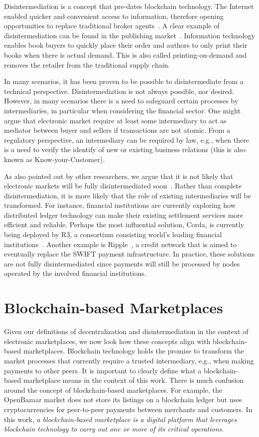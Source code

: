 Disintermediation is a concept that pre-dates blockchain technology.
The Internet enabled quicker and convenient access to information, therefore opening opportunities to replace traditional broker agents~\cite{wigand2020whatever}.
A clear example of disintermediation can be found in the publishing market~\cite{giaglis1999disintermediation}.
Information technology enables book buyers to quickly place their order and authors to only print their books when there is actual demand.
This is also called printing-on-demand and removes the retailer from the traditional supply chain.

In many scenarios, it has been proven to be possible to disintermediate from a technical perspective.
Disintermediation is not always possible, nor desired.
However, in many scenarios there is a need to safeguard certain processes by intermediaries, in particular when considering the financial sector.
One might argue that electronic market require at least some intermediary to act as mediator between buyer and sellers if transactions are not atomic.
From a regulatory perspective, an intermediary can be required by law, e.g., when there is a need to verify the identify of new or existing business relations (this is also known as Know-your-Customer).

As also pointed out by other researchers, we argue that it is not likely that electronic markets will be fully disintermediated soon~\cite{zamani2018little}.
Rather than complete disintermediation, it is more likely that the role of existing intermediaries will be transformed.
For instance, financial institutions are currently exploring how distributed ledger technology can make their existing settlement services more efficient and reliable.
Perhaps the most influential solution, Corda, is currently being deployed by R3, a consortium consisting world's leading financial institutions~\cite{brown2016introducing}.
Another example is Ripple~\cite{armknecht2015ripple}, a credit network that is aimed to eventually replace the SWIFT payment infrastructure.
In practice, these solutions are not fully disintermediated since payments will still be processed by nodes operated by the involved financial institutions.


\section{Blockchain-based Marketplaces}
Given our definitions of decentralization and disintermediation in the context of electronic marketplaces, we now look how these concepts align with blockchain-based marketplaces.
Blockchain technology holds the promise to transform the market processes that currently require a trusted intermediary, e.g., when making payments to other peers.
It is important to clearly define what a blockchain-based marketplace means in the context of this work.
There is much confusion around the concept of blockchain-based marketplaces.
For example, the OpenBazaar market does not store its listings on a blockchain ledger but uses cryptocurrencies for peer-to-peer payments between merchants and customers.
In this work, \emph{a blockchain-based marketplace is a digital platform that leverages blockchain technology to carry out one or more of its critical operations}.

